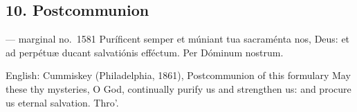 \elementguard
\subsection*{10. Postcommunion }

\begin{appointedlatin}{ --- marginal no.\ 1581}
Puríficent semper et múniant tua sacraménta nos, Deus: et ad perpétuæ ducant
salvatiónis efféctum. Per Dóminum nostrum.
\end{appointedlatin}

\begin{namedtranslation}{English: Cummiskey (Philadelphia, 1861), Postcommunion of this formulary}
May these thy mysteries, O God, continually purify us and strengthen us: and
procure us eternal salvation. Thro'.
\end{namedtranslation}


